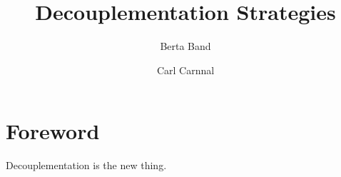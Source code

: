 \documentclass[%
  english,%
  chapterbib=true,
  trtype=collection%
]{hpitr}
\title{Decouplementation Strategies}
\author{Berta Band\and Carl Carnnal}
\date{}
\begin{document}
\maketitle
\frontmatter
\chapter*{Foreword}

Decouplementation is the new thing.

\tableofcontents
\mainmatter
{}
\end{document}
